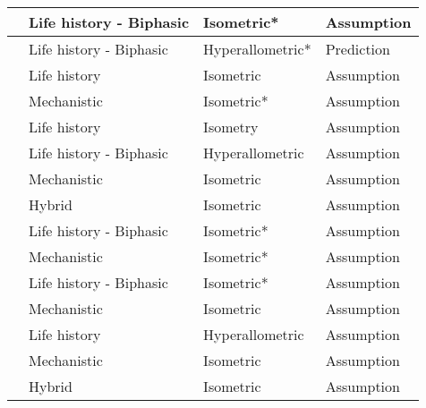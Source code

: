 \documentclass[a4paper]{article} %
\begin{document}
\begin{table}[H]
\begin{tabular}{|l|l|l|l|}
    \textcite{Quince2008}                   & Life history - Biphasic   & Isometric*       & Assumption                     \\ \hline
    \textcite{Quince2008b}                  & Life history - Biphasic   & Hyperallometric* & Prediction                     \\ \hline
    \textcite{Pecquerie2009}                & Life history              & Isometric        & Assumption                     \\ \hline
    \textcite{kooijman2010dynamic}          & Mechanistic               & Isometric*       & Assumption                     \\ \hline
    \textcite{Arendt2011}                   & Life history              & Isometry         & Assumption                     \\ \hline
    \textcite{Ohnishi2011}                  & Life history - Biphasic   & Hyperallometric  & Assumption                     \\ \hline
    \textcite{Brunel2013}                   & Mechanistic               & Isometric        & Assumption                     \\ \hline
    \textcite{Charnov2013}                  & Hybrid                    & Isometric        & Assumption                     \\ \hline
    \textcite{Boukal2014}                   & Life history - Biphasic   & Isometric*       & Assumption                     \\ \hline
    \textcite{Kooijman2014a}                & Mechanistic               & Isometric*       & Assumption                     \\ \hline
    \textcite{Minte-Vera2016a}              & Life history - Biphasic   & Isometric*       & Assumption                     \\ \hline
    \textcite{Jusup2017}                    & Mechanistic               & Isometric        & Assumption                     \\ \hline
    \textcite{Mangel2017}                   & Life history              & Hyperallometric  & Assumption                     \\ \hline
    \textcite{Smallegange2017}              & Mechanistic               & Isometric        & Assumption                     \\ \hline
    \textcite{Audzijonyte2018}              & Hybrid                    & Isometric        & Assumption                     \\ \hline

\end{tabular}
\end{table}
\end{document}

